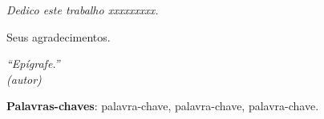 \documentclass[]{senac-tcc}
\begin{document}
\frenchspacing 


\imprimircapa

\imprimirfolhaderosto*


%
\begin{fichacatalografica}
    
\end{fichacatalografica}

%
% 
%
\imprimirfolhadeaprovacaotemporaria

\begin{dedicatoria}
   \vspace*{\fill}
   \centering
   \noindent
   \textit{Dedico este trabalho xxxxxxxxx.} \vspace*{\fill}
\end{dedicatoria}

\begin{agradecimentos}
Seus agradecimentos.
\end{agradecimentos}

\begin{epigrafe}
    \vspace*{\fill}
	\begin{flushright}
		\textit{``Epígrafe.''\\
		(autor)}
	\end{flushright}
\end{epigrafe}


\setlength{\absparsep}{18pt} %
\begin{resumo}
 \lipsum[1] %

 \textbf{Palavras-chaves}: palavra-chave, palavra-chave, palavra-chave.
\end{resumo}
\end{document}
